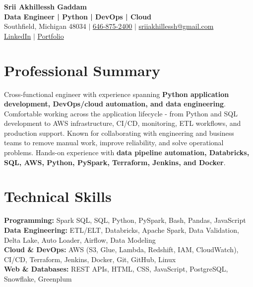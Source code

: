 \documentclass[letterpaper,10pt]{article}
\begin{document}
\fontsize{9.35pt}{10.45pt}\selectfont

\begin{center}
    {\LARGE \textbf{Srii Akhillessh Gaddam}} \\[-1pt]
    \textbf{Data Engineer | Python | DevOps | Cloud} \\[2pt]
    Southfield, Michigan 48034 $|$
    \href{tel:6468752400}{646-875-2400} $|$
    \href{mailto:sriiakhillessh@gmail.com}{sriiakhillessh@gmail.com} \\[1pt]
    \href{https://www.linkedin.com/in/srii-akhiilessh-gaddam-b48668191/}{LinkedIn} $|$
    \href{https://sriiakhillesshg.github.io/portfolio/}{Portfolio}
\end{center}
\vspace{-8pt}

\section{Professional Summary}
\small{Cross-functional engineer with experience spanning \textbf{Python application development, DevOps/cloud automation, and data engineering}. Comfortable working across the application lifecycle - from Python and SQL development to AWS infrastructure, CI/CD, monitoring, ETL workflows, and production support. Known for collaborating with engineering and business teams to remove manual work, improve reliability, and solve operational problems. Hands-on experience with \textbf{data pipeline automation, Databricks, SQL, AWS, Python, PySpark, Terraform, Jenkins, and Docker}.}

\section{Technical Skills}
\small{
\textbf{Programming:} Spark SQL, SQL, Python, PySpark, Bash, Pandas, JavaScript \\
\textbf{Data Engineering:} ETL/ELT, Databricks, Apache Spark, Data Validation, Delta Lake, Auto Loader, Airflow, Data Modeling \\
\textbf{Cloud \& DevOps:} AWS (S3, Glue, Lambda, Redshift, IAM, CloudWatch), CI/CD, Terraform, Jenkins, Docker, Git, GitHub, Linux \\
\textbf{Web \& Databases:} REST APIs, HTML, CSS, JavaScript, PostgreSQL, Snowflake, Greenplum
}

\end{document}
